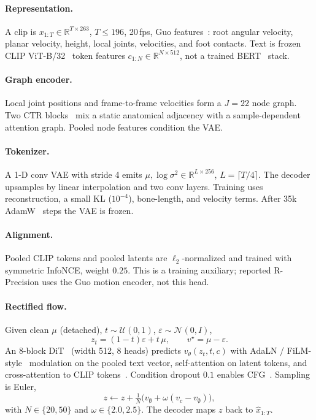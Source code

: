 \documentclass[10pt,twocolumn]{article}
\begin{document}
\paragraph{Representation.}
A clip is $x_{1:T}\in\mathbb{R}^{T\times 263}$, $T\le 196$, 20\,fps, Guo features~\cite{guo2022humanml3d}: root angular velocity, planar velocity, height, local joints, velocities, and foot contacts.
Text is frozen CLIP ViT-B/32~\cite{radford2021clip} token features $c_{1:N}\in\mathbb{R}^{N\times 512}$, not a trained BERT~\cite{devlin2019bert} stack.

\paragraph{Graph encoder.}
Local joint positions and frame-to-frame velocities form a $J{=}22$ node graph.
Two CTR blocks~\cite{chen2021ctrgcn} mix a static anatomical adjacency with a sample-dependent attention graph.
Pooled node features condition the VAE.

\paragraph{Tokenizer.}
A 1-D conv VAE with stride 4 emits $\mu,\log\sigma^2\in\mathbb{R}^{L\times 256}$, $L=\lceil T/4\rceil$.
The decoder upsamples by linear interpolation and two conv layers.
Training uses reconstruction, a small KL ($10^{-4}$), bone-length, and velocity terms.
After 35k AdamW~\cite{loshchilov2019adamw} steps the VAE is frozen.

\paragraph{Alignment.}
Pooled CLIP tokens and pooled latents are $\ell_2$-normalized and trained with symmetric InfoNCE, weight $0.25$.
This is a training auxiliary; reported R-Precision uses the Guo motion encoder, not this head.

\paragraph{Rectified flow.}
Given clean $\mu$ (detached), $t\sim\mathcal{U}(0,1)$, $\varepsilon\sim\mathcal{N}(0,I)$,
\begin{equation}
z_t=(1-t)\varepsilon+t\,\mu,\qquad v^\star=\mu-\varepsilon.
\end{equation}
An 8-block DiT~\cite{peebles2023dit} (width 512, 8 heads) predicts $v_\theta(z_t,t,c)$ with AdaLN / FiLM-style~\cite{perez2018film} modulation on the pooled text vector, self-attention on latent tokens, and cross-attention to CLIP tokens~\cite{vaswani2017attention}.
Condition dropout $0.1$ enables CFG~\cite{ho2022cfg}.
Sampling is Euler,
\begin{equation}
z\leftarrow z+\tfrac{1}{N}\bigl(v_\emptyset+\omega(v_c-v_\emptyset)\bigr),
\end{equation}
with $N\in\{20,50\}$ and $\omega\in\{2.0,2.5\}$.
The decoder maps $z$ back to $\hat x_{1:T}$.
\end{document}
